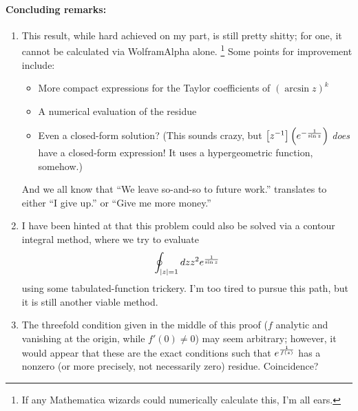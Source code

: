 \paragraph{Concluding remarks:}
\begin{enumerate}[wide, labelindent = 0pt, label = (\roman*)]
\item
This result, while hard achieved on my part, is still pretty shitty;
for one, it cannot be calculated via WolframAlpha alone.%
\footnote{If any Mathematica wizards could numerically calculate this, I'm all ears.}
Some points for improvement include:
\begin{itemize}
    \item More compact expressions for the Taylor coefficients of ${(\arcsin z)}^k$
    \item A numerical evaluation of the residue
    \item Even a closed-form solution?
    (This sounds crazy, but $\left[ z^{-1} \right] \left( e^{-\frac{1}{\sin z}} \right)$ \emph{does} have a closed-form expression!
    It uses a hypergeometric function, somehow.)
\end{itemize}
And we all know that ``We leave so-and-so to future work.'' translates to
either ``I give up.'' or ``Give me more money.''

\item
I have been hinted at that this problem could also be solved via a contour integral method,
where we try to evaluate
\[
    \oint_{\left| z \right| = 1} dz z^2 e^{\frac{1}{\sin z}}
\]
using some tabulated-function trickery.
I'm too tired to pursue this path, but it is still another viable method.

\item
The threefold condition given in the middle of this proof
($f$ analytic and vanishing at the origin, while $f'(0) \neq 0$) may seem arbitrary;
however, it would appear that these are the exact conditions
such that $e^{\frac{1}{f(z)}}$ has a nonzero (or more precisely, not necessarily zero) residue.
Coincidence?

\end{enumerate}